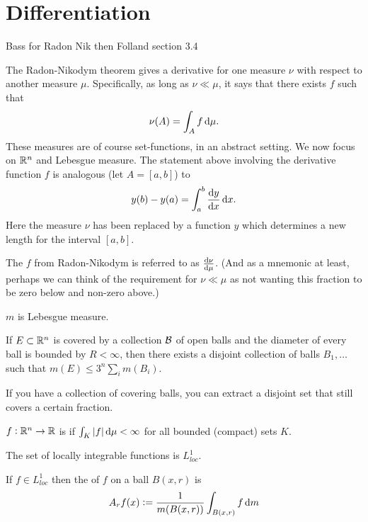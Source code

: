 \section{Differentiation}

Bass for Radon Nik then
Folland section 3.4

The Radon-Nikodym theorem gives a derivative for one measure $\nu$ with respect to another measure $\mu$.
Specifically, as long as $\nu \ll \mu$, it says that there exists $f$ such that
\begin{align*}
  \nu(A) = \int_A f \dmu.
\end{align*}
These measures are of course set-functions, in an abstract setting. We now focus on $\mathbb{R}^n$ and Lebesgue
measure. The statement above involving the derivative function $f$ is analogous (let $A = [a, b]$) to
\begin{align*}
  y(b) - y(a) = \int_a^b \dydx \dx.
\end{align*}
Here the measure $\nu$ has been replaced by a function $y$ which determines a new length for the
interval $[a, b]$.

The $f$ from Radon-Nikodym is referred to as $\frac{\d\nu}{\dmu}$. (And as a mnemonic at least, perhaps we can
think of the requirement for $\nu \ll \mu$ as not wanting this fraction to be zero below and non-zero above.)

$m$ is Lebesgue measure.

\begin{lemma}
  If $E \subset \mathbb{R}^n$ is covered by a collection $\mathcal B$ of open balls and the diameter of every ball is
  bounded by $R < \infty$, then there exists a disjoint collection of balls $B_1, \ldots$ such
  that $m(E) \leq 3^n \sum_i m(B_i)$.
\end{lemma}

If you have a collection of covering balls, you can extract a disjoint set that still covers a certain fraction.

\begin{definition*}
  $f: \mathbb{R}^n \to \mathbb{R}$ is  if $\int_K |f| \dmu < \infty$ for all bounded (compact) sets $K$.

  The set of locally integrable functions is $L^1_{loc}$.
\end{definition*}

\begin{definition}
  If $f \in L^1_{loc}$ then the  of $f$ on a ball $B(x, r)$ is
  \begin{align*}
  A_r f(x) := \frac{1}{m(B(x, r))} \int_{B(x, r)} f \dm
\end{align*}
\end{definition}


